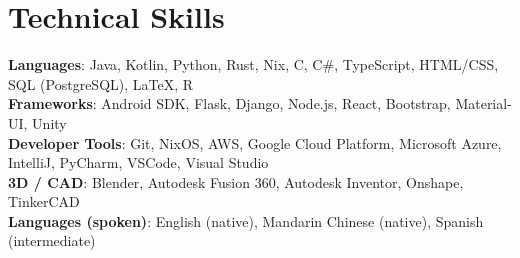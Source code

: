 \section{Technical Skills}
 \begin{itemize}[leftmargin=0.15in, label={}]
    \small{\item{
     \textbf{Languages}{: Java, Kotlin, Python, Rust, Nix, C, C\#, TypeScript, HTML/CSS, SQL (PostgreSQL), \LaTeX, R} \\
     \textbf{Frameworks}{: Android SDK, Flask, Django, Node.js, React, Bootstrap, Material-UI, Unity} \\
     \textbf{Developer Tools}{: Git, NixOS, AWS, Google Cloud Platform, Microsoft Azure, IntelliJ, PyCharm, VSCode, Visual Studio} \\
     \textbf{3D / CAD}{: Blender, Autodesk Fusion 360, Autodesk Inventor, Onshape, TinkerCAD} \\
     \textbf{Languages (spoken)}{: English (native), Mandarin Chinese (native), Spanish (intermediate)} \\
    }}
 \end{itemize}
